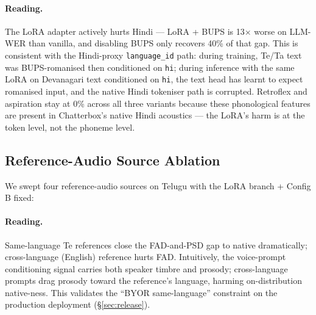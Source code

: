 \documentclass[conference,a4paper]{IEEEtran}
\newcommand{\praxy}{\textsc{Praxy}}
\newcommand{\configb}{Config B}
\begin{document}
\paragraph{Reading.} The LoRA adapter actively hurts Hindi --- LoRA + BUPS is 13$\times$ worse on LLM-WER than vanilla, and disabling BUPS only recovers 40\% of that gap. This is consistent with the Hindi-proxy \texttt{language\_id} path: during training, Te/Ta text was BUPS-romanised then conditioned on \texttt{hi}; during inference with the same LoRA on Devanagari text conditioned on \texttt{hi}, the text head has learnt to expect romanised input, and the native Hindi tokeniser path is corrupted. Retroflex and aspiration stay at 0\% across all three variants because these phonological features are present in Chatterbox's native Hindi acoustics --- the LoRA's harm is at the token level, not the phoneme level.

\subsection{Reference-Audio Source Ablation}
\label{sec:ref_ablation}

We swept four reference-audio sources on Telugu with the LoRA branch + \configb{} fixed:

\begin{table}[t]
\centering
\caption{Reference-audio source ablation on Te pilot ($n=10$; \praxy{} R6 LoRA branch + \configb{} sampling held fixed across all rows; only the voice-prompt reference varies). Same-language reference (Sarvam-Te, Cartesia-Te) wins; cross-language reference (English 49\,s memo) hurts FAD by 26\%.}
\label{tab:ref_ablation}
\small
{}
\end{table}

\paragraph{Reading.} Same-language Te references close the FAD-and-PSD gap to native dramatically; cross-language (English) reference hurts FAD. Intuitively, the voice-prompt conditioning signal carries both speaker timbre and prosody; cross-language prompts drag prosody toward the reference's language, harming on-distribution native-ness. This validates the ``BYOR same-language'' constraint on the production deployment (§\ref{sec:release}).
\end{document}
